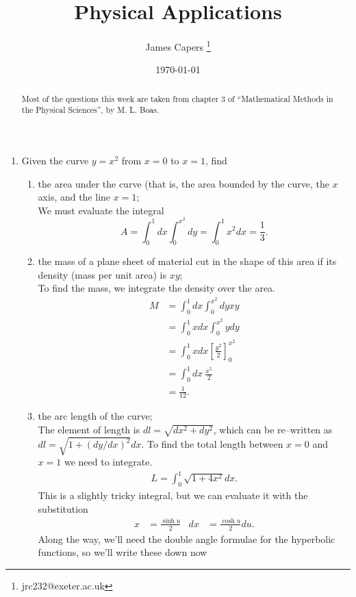 \documentclass{article}
\title{Physical Applications}
\author{James Capers \thanks{jrc232@exeter.ac.uk}}
\date{\today}
\begin{document}
\maketitle

\begin{abstract}
Most of the questions this week are taken from chapter 3 of ``Mathematical Methods in the Physical Sciences'', by M. L. Boas.
\end{abstract}

\begin{enumerate}
	\item{Given the curve $y = x^2$ from $x=0$ to $x=1$, find}
	\begin{enumerate}
		\item{the area under the curve (that is, the area bounded by the curve, the $x$ axis,
		and the line $x = 1$;\\ 
		We must evaluate the integral 
			\begin{equation*}
				A = \int_0^1 dx \int_0^{x^2} dy = \int_0^1 x^2 dx = \frac{1}{3} .
			\end{equation*}		
		}
		\item{the mass of a plane sheet of material cut in the shape of this area if its density (mass per unit area) is $xy$; \\
			To find the mass, we integrate the density over the area.
			\begin{align*}
				M &= \int_0^1 dx \int_0^{x^2} dy xy \\
				&= \int_0^1 x dx \int_0^{x^2} y dy \\
				&= \int_0^1 x dx  \left[ \frac{y^2}{2} \right]_0^{x^2} \\
				&= \int_0^1 dx \ \frac{x^5}{2} \\
				&= \frac{1}{12}.
			\end{align*}
		}
		\item{the arc length of the curve; \\
			The element of length is $dl = \sqrt{dx^2 + dy^2}$, which can be re--written as $dl = \sqrt{1 + (dy/dx)^2} dx$.  To find the total length between $x=0$ and $x=1$ we need to integrate.
			\begin{align*}
				L = \int_0^1 \sqrt{1 + 4x^2} dx .
			\end{align*}
			This is a slightly tricky integral, but we can evaluate it with the substitution 
			\begin{align*}
				x &= \frac{\sinh u}{2} & dx &= \frac{\cosh u}{2} du . 
			\end{align*}
			Along the way, we'll need the double angle formulae for the hyperbolic functions, so we'll write these down now 
}
\end{enumerate}
\end{enumerate}
\end{document}
